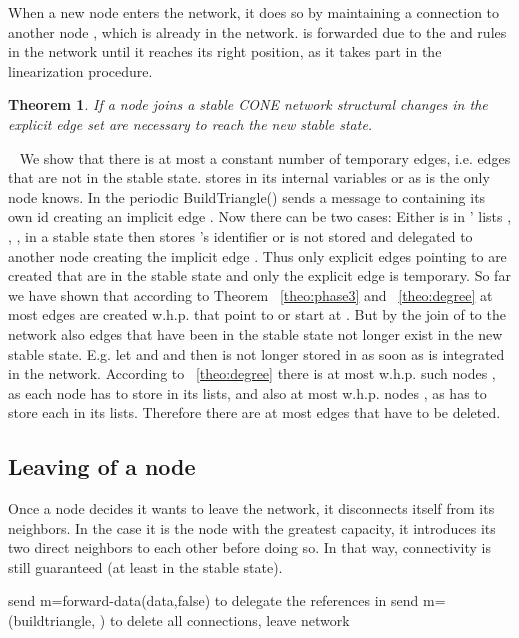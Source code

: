 \documentclass[11pt]{article}
\newtheorem{theorem}{Theorem}[section]
\newcommand{\sq}{\hbox{\rlap{}}}
\newcommand{\qed}{\hspace*{\fill}\sq}
\newenvironment{proof}{\noindent {\bf Proof.}\ }{\qed\par\vskip 4mm\par}
\begin{document}
When a new node  enters the network, it does so by maintaining a connection to another node , which is already in the network.  is forwarded due to the  and  rules in the network until it reaches its right position, as it takes part in the linearization procedure.


\begin{theorem}
If a node  joins a stable CONE network  structural changes in the explicit edge set are necessary to reach the new stable state.
\end{theorem}

\begin{proof}
We show that there is at most a constant number of temporary edges, i.e. edges that are not in the stable state.
 stores  in its internal variables  or  as  is the only node  knows. In the periodic BuildTriangle()  sends a message to  containing its own id creating an implicit edge . Now there can be two cases: Either  is in ' lists , , ,  in a stable state then  stores 's identifier or  is not stored and delegated to another node  creating the implicit edge . Thus only explicit edges pointing to  are created that are in the stable state and only the explicit edge  is temporary. So far we have shown that according to Theorem ~\ref{theo:phase3} and ~\ref{theo:degree} at most  edges are created w.h.p. that point to  or start at . But by the join of  to the network also edges that have been in the stable state not longer exist in the new stable state. E.g. let  and  and  then  is not longer stored in  as soon as  is integrated in the network. According to ~\ref{theo:degree} there is at most  w.h.p. such nodes , as each node  has to store  in its lists, and also at most  w.h.p. nodes , as  has to store each  in its lists. Therefore there are at most  edges that have to be deleted.
\end{proof}



\subsection{Leaving of a node}

Once a node decides it wants to leave the network, it disconnects itself from its neighbors. In the case it is the node with the greatest capacity, it introduces its two direct neighbors to each other before doing so. In that way, connectivity is still guaranteed (at least in the stable state).

\begin{algorithm}
\begin{algorithmic}
\ForAll{}
\State  send m=forward-data(data,false) to 
\State delegate the references in 
\EndFor
\If {}
\State send m=(buildtriangle, ) to 
\EndIf
\State delete all connections, leave network
\EndFunction
\end{algorithmic}
\end{algorithm}
\end{document}
